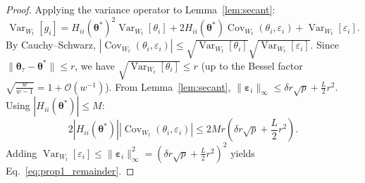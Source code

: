 \documentclass[sn-mathphys,Numbered]{sn-jnl}
\theoremstyle{thmstyleone}
\theoremstyle{thmstyletwo}
\theoremstyle{thmstylethree}
\begin{document}
\begin{proof}
Applying the variance operator to Lemma~\ref{lem:secant}:
\begin{equation}
\operatorname{Var}_{W_t}[g_i] = H_{ii}(\boldsymbol{\theta}^*)^2 \operatorname{Var}_{W_t}[\theta_i] + 2 H_{ii}(\boldsymbol{\theta}^*) \operatorname{Cov}_{W_t}(\theta_i, \varepsilon_i) + \operatorname{Var}_{W_t}[\varepsilon_i].
\end{equation}
By Cauchy--Schwarz, $|\operatorname{Cov}_{W_t}(\theta_i, \varepsilon_i)| \le \sqrt{\operatorname{Var}_{W_t}[\theta_i]} \sqrt{\operatorname{Var}_{W_t}[\varepsilon_i]}$. Since $\|\boldsymbol{\theta}_\tau - \boldsymbol{\theta}^*\| \le r$, we have $\sqrt{\operatorname{Var}_{W_t}[\theta_i]} \le r$ (up to the Bessel factor $\sqrt{\frac{w}{w-1}} = 1 + \mathcal{O}(w^{-1})$). From Lemma~\ref{lem:secant}, $\|\boldsymbol{\varepsilon}_i\|_\infty \le \delta r \sqrt{p} + \frac{L}{2} r^2$. Using $|H_{ii}(\boldsymbol{\theta}^*)| \le M$:
\begin{equation}
2 |H_{ii}(\boldsymbol{\theta}^*)| |\operatorname{Cov}_{W_t}(\theta_i, \varepsilon_i)| \le 2 M r \left( \delta r \sqrt{p} + \frac{L}{2} r^2 \right).
\end{equation}
Adding $\operatorname{Var}_{W_t}[\varepsilon_i] \le \|\boldsymbol{\varepsilon}_i\|_\infty^2 = (\delta r \sqrt{p} + \frac{L}{2} r^2)^2$ yields Eq.~\eqref{eq:prop1_remainder}.
\end{proof}
\end{document}
